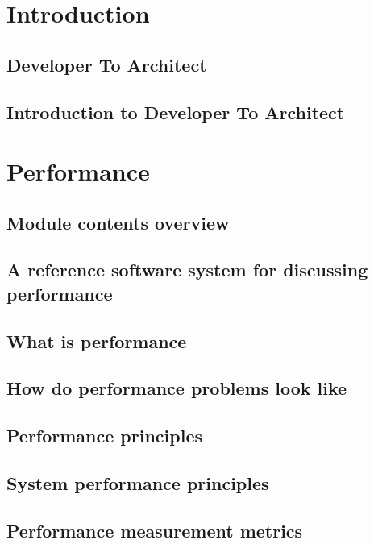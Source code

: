 \documentclass[11pt]{article}
\begin{document}

\chapter{Introduction}

\section{Developer To Architect}

\section{Introduction to Developer To Architect}

\chapter{Performance}

\section{Module contents overview}

\section{A reference software system for discussing performance}

\section{What is performance}

\section{How do performance problems look like}

\section{Performance principles}

\section{System performance principles}

\section{Performance measurement metrics}
\end{document}
